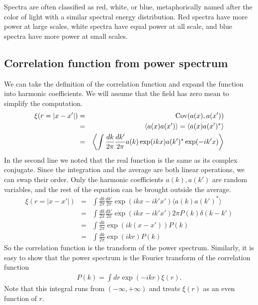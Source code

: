 Spectra are often classified as red, white, or blue, metaphorically named after the color of light with a similar spectral energy distribution.  Red spectra have more power at large scales, white spectra have equal power at all scale, and blue spectra have more power at small scales.

\subsection{Correlation function from power spectrum}

We can take the definition of the correlation function and expand the function into harmonic coefficients.  We will assume that the field has zero mean to simplify the computation.
\begin{eqnarray}
  \xi ( r = |x - x'| ) &=& {\rm Cov}(a(x),a(x')) \nonumber \\
  & = & \langle a(x) a(x') \rangle = \langle a(x) a(x')^* \rangle \nonumber \\
  & = &  \left\langle \int \frac{dk}{2\pi} \frac{dk'}{2\pi}  a(k)\exp(ikx) a(k')^* \exp(-ik'x) \right\rangle
\end{eqnarray}
In the second line we noted that the real function is the same as its complex conjugate.  Since the integration and the average are both linear operations, we can swap their order.  Only the harmonic coefficients $a(k), a(k')$ are random variables, and the rest of the equation can be brought outside the average.
\begin{eqnarray}
  \xi ( r = |x - x'| ) &=& \int \frac{dk}{2\pi} \frac{dk'}{2\pi} \exp(ikx-ik'x') \langle  a(k)a(k')^* \rangle \nonumber \\
  &=& \int \frac{dk}{2\pi} \frac{dk'}{2\pi} \exp(ikx-ik'x') 2\pi P(k) \delta(k-k') \\
  &=& \int \frac{dk}{2\pi}  \exp(ik(x-x')) P(k)  \\
  &=& \int \frac{dk}{2\pi}  \exp(ikr) P(k)
\end{eqnarray}
So the correlation function is the transform of the power spectrum.  Similarly, it is easy to show that the power spectrum is the Fourier transform of the correlation function
\begin{eqnarray}
  P(k) = \int dr \exp(-ikr) \xi(r). \label{eqn:P(k)_from_xi(r)}
\end{eqnarray}
Note that this integral runs from $(-\infty,+\infty)$ and treats $\xi(r)$ as an even function of $r$.

